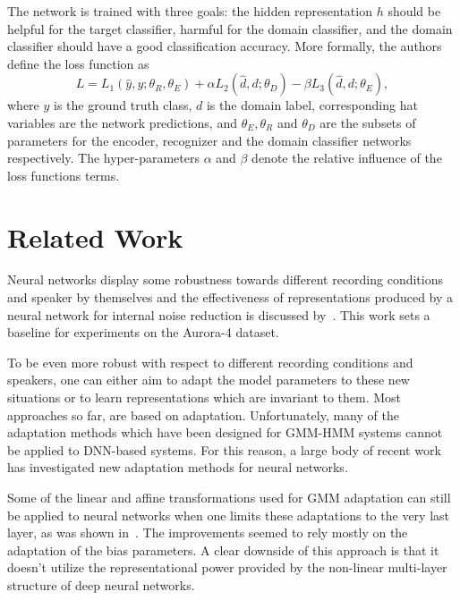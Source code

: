 \documentclass[a4paper]{article}
\begin{document}
    The network is trained with three goals: the hidden representation $h$ should
    be helpful for the target classifier, harmful for the domain classifier,
    and the domain classifier should have a good classification accuracy. More 
    formally, the authors define the loss function as
    \begin{equation}
        L = L_1(\hat{y}, y; \theta_R, \theta_E) + 
        \alpha L_2(\hat{d}, d; \theta_D) -
        \beta L_3(\hat{d}, d; \theta_E),
        \label{eq:grm}
    \end{equation}
    where $y$ is the ground truth class, $d$ is the domain label, corresponding
    hat variables are the network predictions, and $\theta_E, \theta_R$ and 
    $\theta_D$ are the subsets of  parameters for the encoder,
    recognizer and the domain classifier networks respectively. The hyper-parameters
    $\alpha$ and $\beta$ denote the relative influence of the loss functions terms.

\section{Related Work}
\label{sec:relatedwork}
    Neural networks display some robustness towards different recording
    conditions and speaker by themselves and the effectiveness of representations
    produced by a neural network for internal 
    noise reduction is discussed by~\cite{yu2013feature}. This work sets a 
    baseline for experiments on the Aurora-4 dataset.

    To be even more robust with respect to different recording conditions and speakers,
    one can either aim to adapt the model parameters to these new situations or
    to learn representations which are invariant to them.
    Most approaches so far, are based on adaptation.
    Unfortunately, many of the adaptation methods which have been designed for
    GMM-HMM systems cannot be applied to DNN-based systems. For this reason, a
    large body of recent work has investigated new adaptation methods for neural
    networks.

    Some of the linear and affine transformations used for GMM adaptation can
    still be applied to neural networks when one limits these adaptations to the
    very last layer, as was shown in~\cite{yao2012adaptation}. The
    improvements seemed to rely mostly on the adaptation of the bias parameters.
    A clear downside of this approach is that it doesn't utilize the
    representational power provided by the non-linear multi-layer structure of deep
    neural networks.
\end{document}
